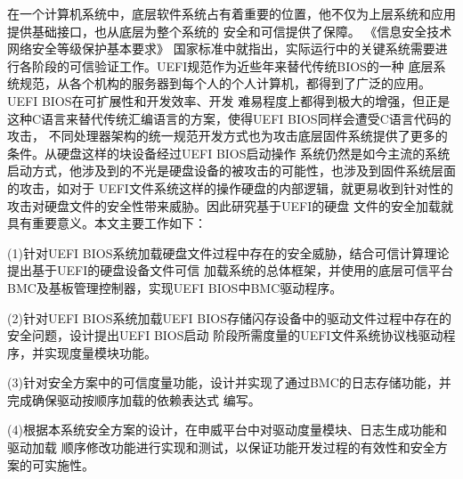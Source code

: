 \begin{cabstract}

在一个计算机系统中，底层软件系统占有着重要的位置，他不仅为上层系统和应用提供基础接口，也从底层为整个系统的
安全和可信提供了保障。
《信息安全技术 网络安全等级保护基本要求》
国家标准中就指出，实际运行中的关键系统需要进行各阶段的可信验证工作。UEFI规范作为近些年来替代传统BIOS的一种
底层系统规范，从各个机构的服务器到每个人的个人计算机，都得到了广泛的应用。UEFI BIOS在可扩展性和开发效率、开发
难易程度上都得到极大的增强，但正是这种C语言来替代传统汇编语言的方案，使得UEFI BIOS同样会遭受C语言代码的攻击，
不同处理器架构的统一规范开发方式也为攻击底层固件系统提供了更多的条件。从硬盘这样的块设备经过UEFI BIOS启动操作
系统仍然是如今主流的系统启动方式，他涉及到的不光是硬盘设备的被攻击的可能性，也涉及到固件系统层面的攻击，如对于
UEFI文件系统这样的操作硬盘的内部逻辑，就更易收到针对性的攻击对硬盘文件的安全性带来威胁。因此研究基于UEFI的硬盘
文件的安全加载就具有重要意义。本文主要工作如下：

\par (1)针对UEFI BIOS系统加载硬盘文件过程中存在的安全威胁，结合可信计算理论提出基于UEFI的硬盘设备文件可信
加载系统的总体框架，并使用的底层可信平台BMC及基板管理控制器，实现UEFI BIOS中BMC驱动程序。
\par (2)针对UEFI BIOS系统加载UEFI BIOS存储闪存设备中的驱动文件过程中存在的安全问题，设计提出UEFI BIOS启动
阶段所需度量的UEFI文件系统协议栈驱动程序，并实现度量模块功能。
\par (3)针对安全方案中的可信度量功能，设计并实现了通过BMC的日志存储功能，并完成确保驱动按顺序加载的依赖表达式
编写。
\par (4)根据本系统安全方案的设计，在申威平台中对驱动度量模块、日志生成功能和驱动加载
顺序修改功能进行实现和测试，以保证功能开发过程的有效性和安全方案的可实施性。

\end{cabstract}

